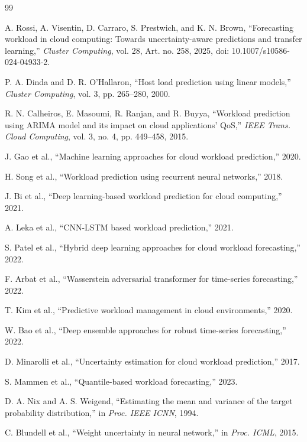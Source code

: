 \documentclass[conference]{IEEEtran}
\begin{document}
\begin{thebibliography}{99}

A. Rossi, A. Visentin, D. Carraro, S. Prestwich, and K. N. Brown,
``Forecasting workload in cloud computing: Towards uncertainty-aware predictions and transfer learning,''
\emph{Cluster Computing}, vol. 28, Art. no. 258, 2025,
doi: 10.1007/s10586-024-04933-2.

P. A. Dinda and D. R. O'Hallaron,
``Host load prediction using linear models,''
\emph{Cluster Computing}, vol. 3, pp. 265--280, 2000.

R. N. Calheiros, E. Masoumi, R. Ranjan, and R. Buyya,
``Workload prediction using ARIMA model and its impact on cloud applications' QoS,''
\emph{IEEE Trans. Cloud Computing}, vol. 3, no. 4, pp. 449--458, 2015.

J. Gao et al.,
``Machine learning approaches for cloud workload prediction,''
2020.

H. Song et al.,
``Workload prediction using recurrent neural networks,''
2018.

J. Bi et al.,
``Deep learning-based workload prediction for cloud computing,''
2021.

A. Leka et al.,
``CNN-LSTM based workload prediction,''
2021.

S. Patel et al.,
``Hybrid deep learning approaches for cloud workload forecasting,''
2022.

F. Arbat et al.,
``Wasserstein adversarial transformer for time-series forecasting,''
2022.

T. Kim et al.,
``Predictive workload management in cloud environments,''
2020.

W. Bao et al.,
``Deep ensemble approaches for robust time-series forecasting,''
2022.

D. Minarolli et al.,
``Uncertainty estimation for cloud workload prediction,''
2017.

S. Mammen et al.,
``Quantile-based workload forecasting,''
2023.

D. A. Nix and A. S. Weigend,
``Estimating the mean and variance of the target probability distribution,''
in \emph{Proc. IEEE ICNN}, 1994.

C. Blundell et al.,
``Weight uncertainty in neural network,''
in \emph{Proc. ICML}, 2015.


\end{thebibliography}
\end{document}
